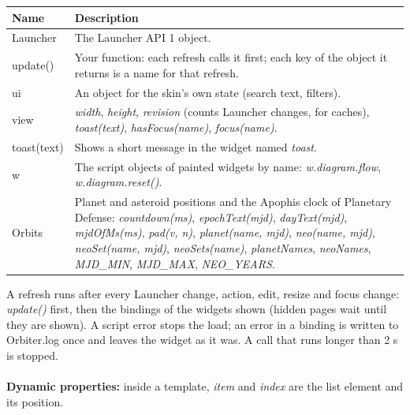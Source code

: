 \documentclass[Orbiter Developer Manual.tex]{subfiles}
\begin{document}
\begin{sloppypar}
	\begin{longtable}{ |p{}|p{}| }
	\hline\rule{0pt}{2ex}
	\textbf{Name} & \textbf{Description}\\
	\hline\rule{0pt}{2ex}
	Launcher & The Launcher API 1 object.\\
	\hline\rule{0pt}{2ex}
	update() & Your function: each refresh calls it first; each key of the object it returns is a name for that refresh.\\
	\hline\rule{0pt}{2ex}
	ui & An object for the skin's own state (search text, filters).\\
	\hline\rule{0pt}{2ex}
	view & \textit{width}, \textit{height}, \textit{revision} (counts Launcher changes, for caches), \textit{toast(text)}, \textit{hasFocus(name)}, \textit{focus(name)}.\\
	\hline\rule{0pt}{2ex}
	toast(text) & Shows a short message in the widget named \textit{toast}.\\
	\hline\rule{0pt}{2ex}
	w & The script objects of painted widgets by name: \textit{w.diagram.flow}, \textit{w.diagram.reset()}.\\
	\hline\rule{0pt}{2ex}
	Orbits & Planet and asteroid positions and the Apophis clock of Planetary Defense: \textit{countdown(ms)}, \textit{epochText(mjd)}, \textit{dayText(mjd)}, \textit{mjdOfMs(ms)}, \textit{pad(v, n)}, \textit{planet(name, mjd)}, \textit{neo(name, mjd)}, \textit{neoSet(name, mjd)}, \textit{neoSets(name)}, \textit{planetNames}, \textit{neoNames}, \textit{MJD\_MIN}, \textit{MJD\_MAX}, \textit{NEO\_YEARS}.\\
	\hline
	\end{longtable}

\noindent
A refresh runs after every Launcher change, action, edit, resize and focus change: \textit{update()} first, then the bindings of the widgets shown (hidden pages wait until they are shown). A script error stops the load; an error in a binding is written to Orbiter.log once and leaves the widget as it was. A call that runs longer than 2 s is stopped.\\
\\
\textbf{Dynamic properties:} inside a template, \textit{item} and \textit{index} are the list element and its position.


\end{sloppypar}
\end{document}
